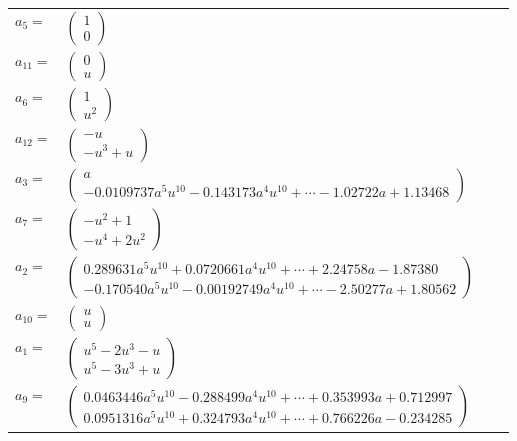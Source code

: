 \documentclass[1p]{elsarticle_modified}
\theoremstyle{definition}
\begin{document}
\begin{tabular}{m{7pt} m{180pt} m{7pt} m{180pt} }
\flushright $a_{5}=$&$\begin{pmatrix}1\\0\end{pmatrix}$ \\
\flushright $a_{11}=$&$\begin{pmatrix}0\\u\end{pmatrix}$ \\
\flushright $a_{6}=$&$\begin{pmatrix}1\\u^2\end{pmatrix}$ \\
\flushright $a_{12}=$&$\begin{pmatrix}- u\\- u^3+u\end{pmatrix}$ \\
\flushright $a_{3}=$&$\begin{pmatrix}a\\-0.0109737 a^{5} u^{10}-0.143173 a^{4} u^{10}+\cdots-1.02722 a+1.13468\end{pmatrix}$ \\
\flushright $a_{7}=$&$\begin{pmatrix}- u^2+1\\- u^4+2 u^2\end{pmatrix}$ \\
\flushright $a_{2}=$&$\begin{pmatrix}0.289631 a^{5} u^{10}+0.0720661 a^{4} u^{10}+\cdots+2.24758 a-1.87380\\-0.170540 a^{5} u^{10}-0.00192749 a^{4} u^{10}+\cdots-2.50277 a+1.80562\end{pmatrix}$ \\
\flushright $a_{10}=$&$\begin{pmatrix}u\\u\end{pmatrix}$ \\
\flushright $a_{1}=$&$\begin{pmatrix}u^5-2 u^3- u\\u^5-3 u^3+u\end{pmatrix}$ \\
\flushright $a_{9}=$&$\begin{pmatrix}0.0463446 a^{5} u^{10}-0.288499 a^{4} u^{10}+\cdots+0.353993 a+0.712997\\0.0951316 a^{5} u^{10}+0.324793 a^{4} u^{10}+\cdots+0.766226 a-0.234285\end{pmatrix}$ \\

\end{tabular}
\end{document}
